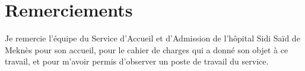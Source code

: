 %
%

\chapter*{Remerciements}

Je remercie l'équipe du Service d'Accueil et d'Admission de l'hôpital Sidi Saïd de Meknès pour
son accueil, pour le cahier de charges qui a donné son objet à ce travail, et pour m'avoir permis
d'observer un poste de travail du service.
